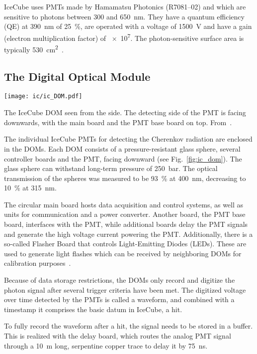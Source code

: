 IceCube uses PMTs made by Hamamatsu Photonics (R7081--02) and which are sensitive to photons between 300 and \SI{650}{\nm}. They have a quantum efficiency (QE) at \SI{390}{\nm} of \SI{25}{\percent}, are operated with a voltage of \SI{1500}{\V} and have a gain (electron multiplication factor) of \num{e7}. The photon-sensitive surface area is typically \SI{530}{\cm\squared}~.

\subsection{The Digital Optical Module}\label{DOM}
\begin{marginfigure}
    \texttt{[image: ic/ic\_DOM.pdf]}
    \caption[IceCube digital optical module]{The IceCube DOM seen from the side. The detecting side of the PMT is facing downwards, with the main board and the PMT base board on top. From~\cite{Aartsen2017}.}
\end{marginfigure}

The individual IceCube PMTs for detecting the Cherenkov radiation are enclosed in the DOMs. Each DOM consists of a pressure-resistant glass sphere, several controller boards and the PMT, facing downward (see Fig.~\ref{fig:ic_dom}). The glass sphere can withstand long-term pressure of \SI{250}{\bar}. The optical transmission of the spheres was measured to be \SI{93}{\percent} at \SI{400}{\nm}, decreasing to \SI{10}{\percent} at \SI{315}{\nm}.

The circular main board hosts data acquisition and control systems, as well as units for communication and a power converter. Another board, the PMT base board, interfaces with the PMT, while additional boards delay the PMT signals and generate the high voltage current powering the PMT. Additionally, there is a so-called Flasher Board that controls Light-Emitting Diodes (LEDs). These are used to generate light flashes which can be received by neighboring DOMs for calibration purposes~.

Because of data storage restrictions, the DOMs only record and digitize the photon signal after several trigger criteria have been met. The digitized voltage over time detected by the PMTs is called a waveform, and combined with a timestamp it comprises the basic datum in IceCube, a hit.

To fully record the waveform after a hit, the signal needs to be stored in a buffer. This is realized with the delay board, which routes the analog PMT signal through a \SI{10}{\m} long, serpentine copper trace to delay it by \SI{75}{\ns}.

